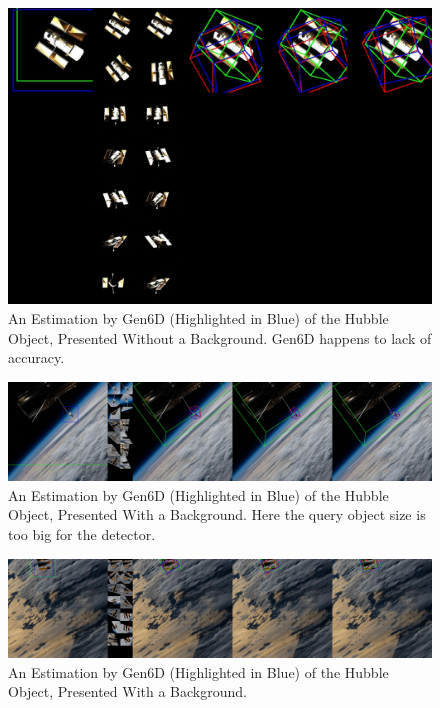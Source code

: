 \begin{figure}[ht]
  \centering
  \includegraphics[width=\textwidth]{data/res3.jpg}
  \caption{An Estimation by Gen6D (Highlighted in Blue) of the Hubble Object, Presented Without a Background. Gen6D happens to lack of accuracy.}
  \label{fig:cap1}
\end{figure}

\begin{figure}[ht]
  \centering
  \includegraphics[width=\textwidth]{data/res4.jpg}
  \caption{An Estimation by Gen6D (Highlighted in Blue) of the Hubble Object, Presented With a Background. Here the query object size is too big for the detector.}
  \label{fig:cap4}
\end{figure}

\begin{figure}[ht]
  \centering
  \includegraphics[width=\textwidth]{data/res1.jpg}
  \caption{An Estimation by Gen6D (Highlighted in Blue) of the Hubble Object, Presented With a Background.}
  \label{fig:cap2}
\end{figure}



